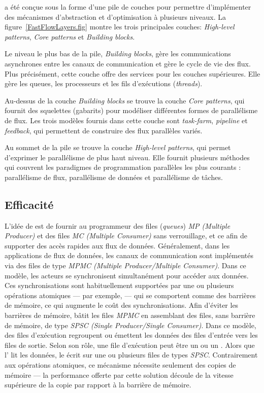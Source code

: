  a \'et\'e conçue sous la forme d'une pile de couches pour permettre d'impl\'ementer des m\'ecanismes d'abstraction et d'optimisation \`a plusieurs niveaux. La figure~\ref{FastFlowLayers.fig} montre les trois principales couches: \emph{High-level patterns}, \emph{Core patterns} et \emph{Building blocks}. 

Le niveau le plus bas de la pile, \emph{Building blocks}, g\`ere les communications asynchrones entre les canaux de communication et g\`ere le cycle de vie des flux. Plus pr\'ecis\'ement, cette couche offre des services pour les couches sup\'erieures. Elle g\`ere les queues, les processeurs et les fils d'ex\'ecutions (\emph{threads}).

Au-dessus de la couche \emph{Building blocks} se trouve la couche \emph{Core patterns}, qui fournit des squelettes (gabarits) pour mod\'eliser diff\'erentes formes de parall\'elisme de flux. Les trois mod\`eles fournis dans cette couche sont \emph{task-farm}, \emph{pipeline} et \emph{feedback}, qui permettent de construire des flux parall\`eles vari\'es. 

Au sommet de la pile se trouve la couche \emph{High-level patterns}, qui permet d'exprimer le parall\'elisme de plus haut niveau. Elle fournit plusieurs m\'ethodes qui couvrent les paradigmes de programmation parall\`eles les plus courants : parall\'elisme de flux, parall\'elisme de donn\'ees et  parall\'elisme de t\^aches. 

\subsection{Efficacit\'e}

L'id\'ee de  est de fournir au programmeur des files (\emph{queues}) \emph{MP (Multiple Producer)} et des files \emph{MC (Multiple Consumer)} sans verrouillage, et ce afin de supporter des acc\`es rapides aux flux de donn\'ees. G\'en\'eralement, dans les applications de flux de donn\'ees, les canaux de communication sont impl\'ementés via des files de type \emph{MPMC (Multiple Producer/Multiple Consumer)}. Dans ce modèle, les acteurs se synchronisent simultanément pour acc\'eder aux donn\'ees. Ces synchronisations sont habituellement support\'ees par une ou plusieurs op\'erations atomiques --- par exemple,  --- qui se comportent comme des barri\`eres de m\'emoire, ce qui augmente le co\^ut des synchronisations. Afin d'\'eviter les barri\`eres de m\'emoire,  b\^atit les files \emph{MPMC} en assemblant des files, sans barri\`ere de m\'emoire, de type \emph{SPSC (Single Producer/Single Consumer)}. Dans ce mod\`ele, des files d’ex\'ecution regroupent ou \'emettent les donn\'ees des files d'entr\'ee vers les files de sortie. Selon son r\^ole, une file d'ex\'ecution peut \^etre un  ou un . Alors que l' lit les donn\'ees, le  \'ecrit sur une ou plusieurs files de types \emph{SPSC}. Contrairement aux op\'erations atomiques, ce m\'ecanisme n\'ecessite seulement des copies de m\'emoire --- la performance offerte par cette solution d\'ecoule de la vitesse sup\'erieure de la copie par rapport \`a la barri\`ere de m\'emoire.


